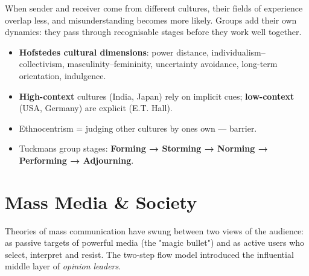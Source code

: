 When sender and receiver come from different cultures, their fields of experience overlap less, and
misunderstanding becomes more likely. Groups add their own dynamics: they pass through recognisable stages
before they work well together.

\begin{itemize}
\tightlist
\item
  \textbf{Hofstede\textquotesingle s cultural dimensions}: power distance, individualism--collectivism, masculinity--femininity, uncertainty avoidance, long-term orientation, indulgence.
\item
  \textbf{High-context} cultures (India, Japan) rely on implicit cues; \textbf{low-context} (USA, Germany) are explicit (E.T. Hall).
\item
  Ethnocentrism = judging other cultures by one\textquotesingle s own --- barrier.
\item
  Tuckman\textquotesingle s group stages: \textbf{Forming → Storming → Norming → Performing → Adjourning}.
\end{itemize}



\needspace{125pt}

\hypertarget{p1-04--6-mass-media--society}{%
\section{Mass Media \& Society}\label{p1-04--6-mass-media--society}}

Theories of mass communication have swung between two views of the audience: as passive targets of
powerful media (the "magic bullet") and as active users who select, interpret and resist. The two-step flow
model introduced the influential middle layer of \emph{opinion leaders}.



\begingroup\small

